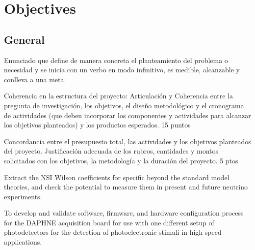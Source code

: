\documentclass[a4paper,10pt,epsfig,epsf,amsfonts,amsmath]{article}
\begin{document}








\section{Objectives}
\subsection{General}
\begin{colciencias}
  Enunciado que define de manera concreta el planteamiento del
  problema o necesidad y se inicia con un verbo en modo infinitivo, es
  medible, alcanzable y conlleva a una meta.
\end{colciencias}
\begin{evaluacion}
  Coherencia en la estructura del proyecto:
Articulación y Coherencia entre la pregunta de
investigación, los objetivos, el diseño metodológico y
el cronograma de actividades (que deben incorporar
los componentes y actividades para alcanzar los
objetivos planteados) y los productos esperados. 15
puntos

Concordancia entre el presupuesto total, las
actividades y los objetivos planteados del proyecto.
Justificación adecuada de los rubros, cantidades y
montos solicitados con los objetivos, la metodología
y la duración del proyecto. 5 ptos
\end{evaluacion}
Extract the NSI Wilson coefficients for specific beyond the standard model theories, and check the potential to measure them in present and future neutrino experiments.


To develop and validate software, firmware, and hardware configuration process for the DAPHNE acquisition board for use with one different setup of photodetectors for the detection of photoelectronic stimuli in high-speed applications.
\end{document}
